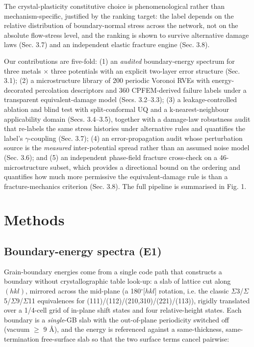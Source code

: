 \documentclass[11pt]{article}
\begin{document}
The crystal-plasticity constitutive choice is phenomenological rather than mechanism-specific, justified by the ranking target: the label depends on the relative distribution of boundary-normal stress across the network, not on the absolute flow-stress level, and the ranking is shown to survive alternative damage laws (Sec. 3.7) and an independent elastic fracture engine (Sec. 3.8).

Our contributions are five-fold: (1) an \textit{audited} boundary-energy spectrum for three metals $\times$ three potentials with an explicit two-layer error structure (Sec. 3.1); (2) a microstructure library of 200 periodic Voronoi RVEs with energy-decorated percolation descriptors and 360 CPFEM-derived failure labels under a transparent equivalent-damage model (Secs. 3.2--3.3); (3) a leakage-controlled ablation and blind test with split-conformal UQ and a k-nearest-neighbour applicability domain (Secs. 3.4--3.5), together with a damage-law robustness audit that re-labels the same stress histories under alternative rules and quantifies the label's $\gamma$-coupling (Sec. 3.7); (4) an error-propagation audit whose perturbation source is the \textit{measured} inter-potential spread rather than an assumed noise model (Sec. 3.6); and (5) an independent phase-field fracture cross-check on a 46-microstructure subset, which provides a directional bound on the ordering and quantifies how much more permissive the equivalent-damage rule is than a fracture-mechanics criterion (Sec. 3.8). The full pipeline is summarised in Fig. 1.

\section{Methods}

\subsection{Boundary-energy spectra (E1)}

Grain-boundary energies come from a single code path that constructs a boundary without crystallographic table look-up: a slab of lattice cut along $(hkl)$, mirrored across the mid-plane (a 180$^\circ$[$hkl$] rotation, i.e. the classic $\Sigma$3/$\Sigma$5/$\Sigma$9/$\Sigma$11 equivalences for (111)/(112)/(210,310)/(221)/(113)), rigidly translated over a 1/4-cell grid of in-plane shift states and four relative-height states. Each boundary is a \textit{single}-GB slab with the out-of-plane periodicity switched off (vacuum $\ge$ 9 \AA), and the energy is referenced against a same-thickness, same-termination free-surface slab so that the two surface terms cancel pairwise:
\end{document}

